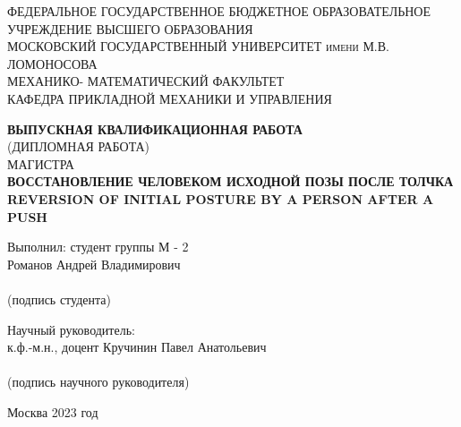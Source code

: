 \documentclass[a4paper,12pt, openany]{book}
\theoremstyle{plain} %
\theoremstyle{definition} %
\theoremstyle{remark} %
\numberwithin{equation}{chapter}
\begin{document}
\newpage
\thispagestyle{empty}


\begin{center}
\large{\textsc{ФЕДЕРАЛЬНОЕ ГОСУДАРСТВЕННОЕ БЮДЖЕТНОЕ ОБРАЗОВАТЕЛЬНОЕ
УЧРЕЖДЕНИЕ ВЫСШЕГО ОБРАЗОВАНИЯ}
}\\
\large{\textsc{МОСКОВСКИЙ ГОСУДАРСТВЕННЫЙ УНИВЕРСИТЕТ имени М.В. ЛОМОНОСОВА}
} \\
 \vspace{0.4cm}
\large{\textsc{МЕХАНИКО- МАТЕМАТИЧЕСКИЙ ФАКУЛЬТЕТ}}\\
\vspace{0.4cm}
\large{\textsc{КАФЕДРА ПРИКЛАДНОЙ МЕХАНИКИ И УПРАВЛЕНИЯ}}\\
\hfill \break

\hfill \break
\large{\textbf{ВЫПУСКНАЯ КВАЛИФИКАЦИОННАЯ РАБОТА}\\
(ДИПЛОМНАЯ РАБОТА) \\ МАГИСТРА \\
\hfill \break \textsc{\textbf{ВОССТАНОВЛЕНИЕ ЧЕЛОВЕКОМ ИСХОДНОЙ ПОЗЫ ПОСЛЕ ТОЛЧКА} \\
\textbf{REVERSION OF INITIAL POSTURE BY A PERSON AFTER A PUSH}
}}
\end{center}
 
\vspace{1.5cm}
\begin{flushright}
\large{
Выполнил: студент группы М - 2 \\ Романов Андрей Владимирович} \\ \vspace{0.68cm}  \underline{\hspace{6.5cm}} \\ 
 (подпись студента)

\end{flushright}
 
\begin{flushright}
\large{
Научный руководитель: \\ к.ф.-м.н., доцент Кручинин Павел Анатольевич} \\ \vspace{0.68cm}
 \underline{\hspace{6.5cm}} \\
 (подпись научного руководителя)
\end{flushright}
\vspace{0.7cm}
\begin{center} \large{Москва  2023 год} \end{center}
\end{document}
